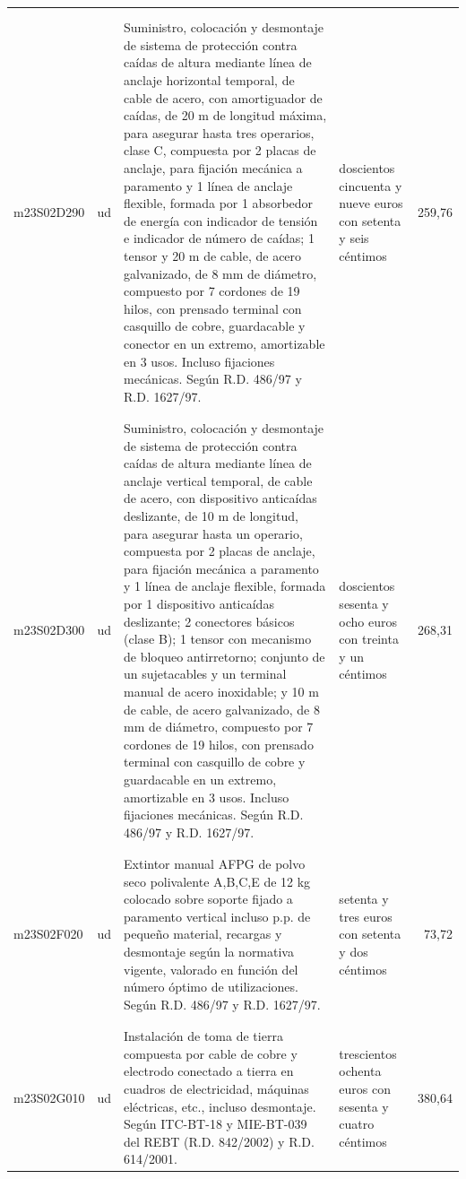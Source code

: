 \begin{supertabular}{|l|l|p{5cm}|p{3cm}|r|}
&&&&\\%
&&&&\\%
m23S02D290&ud&Suministro, colocación y desmontaje de sistema de protección contra caídas de altura mediante línea de anclaje horizontal temporal, de cable de acero, con amortiguador de caídas, de 20 m de longitud máxima, para asegurar hasta tres operarios, clase C, compuesta por 2 placas de anclaje, para fijación mecánica a paramento y 1 línea de anclaje flexible, formada por 1 absorbedor de energía con indicador de tensión e indicador de número de caídas; 1 tensor y 20 m de cable, de acero galvanizado, de 8 mm de diámetro, compuesto por 7 cordones de 19 hilos, con prensado terminal con casquillo de cobre, guardacable y conector en un extremo, amortizable en 3 usos. Incluso fijaciones mecánicas. Según R.D. 486/97 y R.D. 1627/97.&doscientos cincuenta y nueve euros con setenta y seis céntimos&259,76\\%
&&&&\\%
&&&&\\%
m23S02D300&ud&Suministro, colocación y desmontaje de sistema de protección contra caídas de altura mediante línea de anclaje vertical temporal, de cable de acero, con dispositivo anticaídas deslizante, de 10 m de longitud, para asegurar hasta un operario, compuesta por 2 placas de anclaje, para fijación mecánica a paramento y 1 línea de anclaje flexible, formada por 1 dispositivo anticaídas deslizante; 2 conectores básicos (clase B); 1 tensor con mecanismo de bloqueo antirretorno; conjunto de un sujetacables y un terminal manual de acero inoxidable; y 10 m de cable, de acero galvanizado, de 8 mm de diámetro, compuesto por 7 cordones de 19 hilos, con prensado terminal con casquillo de cobre y guardacable en un extremo, amortizable en 3 usos. Incluso fijaciones mecánicas. Según R.D. 486/97 y R.D. 1627/97.&doscientos sesenta y ocho euros con treinta y un céntimos&268,31\\%
&&&&\\%
&&&&\\%
m23S02F020&ud&Extintor manual AFPG de polvo seco polivalente A,B,C,E de 12 kg colocado sobre soporte fijado a paramento vertical incluso p.p. de pequeño material, recargas y desmontaje según la normativa vigente, valorado en función del número óptimo de utilizaciones. Según R.D. 486/97 y R.D. 1627/97.&setenta y tres euros con setenta y dos céntimos&73,72\\%
&&&&\\%
&&&&\\%
m23S02G010&ud&Instalación de toma de tierra compuesta por cable de cobre y electrodo conectado a tierra en cuadros de electricidad, máquinas eléctricas, etc., incluso desmontaje. Según ITC{-}BT{-}18 y MIE{-}BT{-}039 del REBT (R.D. 842/2002) y R.D. 614/2001.&trescientos ochenta euros con sesenta y cuatro céntimos&380,64\\%

\end{supertabular}
